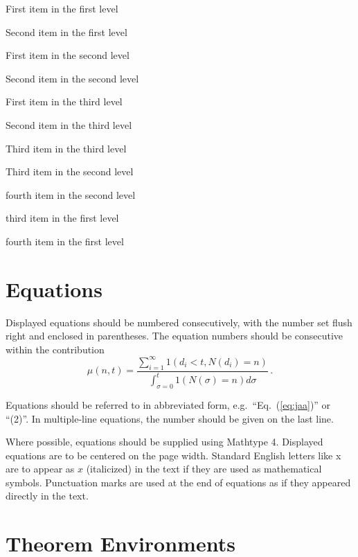 \documentclass{ws-ijicc}
\begin{document}
\begin{arabiclist}
\item First item in the first level
\item Second item in the first level
\begin{alphlist}[(a)]
\item First item in the second level
\item Second item in the second level
\begin{romanlist}[iii.]
\item First item in the third level
\item Second item in the third level
\item Third item in the third level
\end{romanlist}
\item Third item in the second level
\item fourth item in the second level
\end{alphlist}
\item third item in the first level
\item fourth item in the first level
\end{arabiclist}

\section{Equations}
Displayed equations should be numbered consecutively, with the number
set flush right and enclosed in parentheses. The equation numbers
should be consecutive within the contribution
\begin{equation}
\mu(n, t) = \frac{\sum^\infty_{i=1} 1(d_i < t, N(d_i)
= n)}{\int^t_{\sigma=0} 1(N(\sigma) = n)d\sigma}\,.
\label{eq:jaa}
\end{equation}

Equations should be referred to in abbreviated form,
e.g.~``Eq.~(\ref{eq:jaa})'' or ``(2)''. In multiple-line equations,
the number should be given on the last line.

Where possible, equations should be supplied using Mathtype 4.
Displayed equations are to be centered on the page width.  Standard
English letters like x are to appear as $x$ (italicized) in the text
if they are used as mathematical symbols. Punctuation marks are used
at the end of equations as if they appeared directly in the text.

\section{Theorem Environments}
\end{document}
